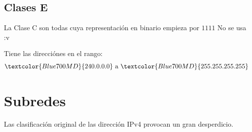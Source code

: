 \documentclass[12pt, fleqn]{report}                             %
\theoremstyle{break}                                            %
\newcommand{\Color}[2]{\textcolor{#1}{#2}}                      %
\begin{document}
            \vspace{1em}
            \subsection{Clases E}

                La Clase C son todas cuya representación en binario empieza por $1111$
                No se usa :v

                Tiene las direcciónes en el rango:
                \begin{equation*}
                    \Color{Blue700MD}{240.0.0.0}
                    \text{ a }
                    \Color{Blue700MD}{255.255.255.255}
                \end{equation*}













        \clearpage
        \section{Subredes}

            Las clasificación original de las dirección IPv4 provocan un gran desperdicio.
\end{document}
